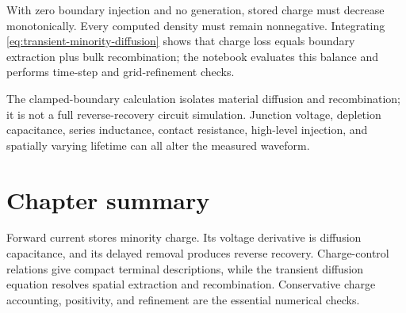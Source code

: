 \begin{modelcheck}
With zero boundary injection and no generation, stored charge must decrease
monotonically.  Every computed density must remain nonnegative.  Integrating
\cref{eq:transient-minority-diffusion} shows that charge loss equals boundary
extraction plus bulk recombination; the notebook evaluates this balance and
performs time-step and grid-refinement checks.
\end{modelcheck}

\begin{boundarybox}
The clamped-boundary calculation isolates material diffusion and recombination;
it is not a full reverse-recovery circuit simulation.  Junction voltage,
depletion capacitance, series inductance, contact resistance, high-level
injection, and spatially varying lifetime can all alter the measured waveform.
\end{boundarybox}

\section{Chapter summary}

Forward current stores minority charge.  Its voltage derivative is diffusion
capacitance, and its delayed removal produces reverse recovery.  Charge-control
relations give compact terminal descriptions, while the transient diffusion
equation resolves spatial extraction and recombination.  Conservative charge
accounting, positivity, and refinement are the essential numerical checks.
